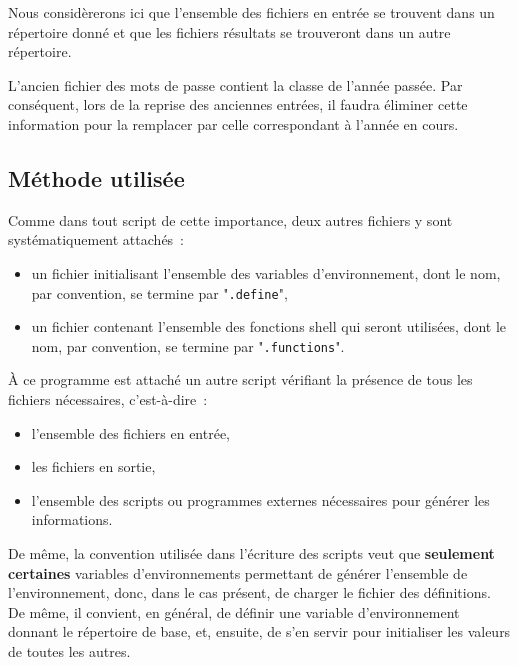 Nous consid{\`e}rerons ici que l'ensemble des fichiers en entr{\'e}e se trouvent dans un
r{\'e}pertoire donn{\'e} et que les fichiers r{\'e}sultats se trouveront dans un autre r{\'e}pertoire.

\begin{remarque}
L'ancien fichier des mots de passe contient la classe de l'ann{\'e}e pass{\'e}e. Par cons{\'e}quent,
lors de la reprise des anciennes entr{\'e}es, il faudra {\'e}liminer cette information pour
la remplacer par celle correspondant {\`a} l'ann{\'e}e en cours.
\end{remarque}

\subsection{\label{adv-programming-ex3-meth}M{\'e}thode utilis{\'e}e}

Comme dans tout script de cette importance, deux autres fichiers y sont syst{\'e}matiquement
attach{\'e}s~:
\begin{itemize}
	\item	un fichier initialisant l'ensemble des variables d'environnement, dont le
			nom, par convention, se termine par "{\tt .define}",
	\item	un fichier contenant l'ensemble des fonctions shell qui seront utilis{\'e}es, dont
			le nom, par convention, se termine par "{\tt .functions}".
\end{itemize}
{\`A} ce programme est attach{\'e} un autre script v{\'e}rifiant la pr{\'e}sence de tous les fichiers
n{\'e}cessaires, c'est-{\`a}-dire~:
\begin{itemize}
	\item	l'ensemble des fichiers en entr{\'e}e,
	\item	les fichiers en sortie,
	\item	l'ensemble des scripts ou programmes externes n{\'e}cessaires pour g{\'e}n{\'e}rer les
			informations.
\end{itemize}

De m{\^e}me, la convention utilis{\'e}e dans l'{\'e}criture des scripts veut que {\bf seulement
certaines} variables d'environnements permettant de g{\'e}n{\'e}rer l'ensemble de l'envi\-ron\-nement,
donc, dans le cas pr{\'e}sent, de charger le fichier des d{\'e}finitions. De m{\^e}me, il convient, en
g{\'e}n{\'e}ral, de d{\'e}finir une variable d'environnement donnant le r{\'e}pertoire de base, et,
ensuite, de s'en servir pour initialiser les valeurs de toutes les autres.

